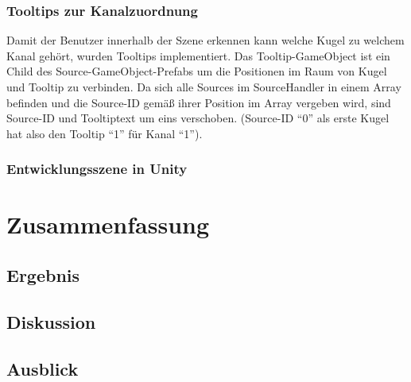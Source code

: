 \documentclass[11pt, titlepage, fleqn]{report}
\begin{document}
            \subsection{Tooltips zur Kanalzuordnung}
            \label{sec:3.3.4}
                Damit der Benutzer innerhalb der Szene erkennen kann welche Kugel zu welchem Kanal gehört, wurden Tooltips implementiert. 
                Das Tooltip-GameObject ist ein Child des Source-GameObject-Prefabs um die Positionen im Raum von Kugel und Tooltip zu verbinden. 
                Da sich alle Sources im SourceHandler in einem Array befinden und die Source-ID gemäß ihrer Position im Array vergeben wird, 
                sind Source-ID und Tooltiptext um eins verschoben. (Source-ID “0” als erste Kugel hat also den Tooltip “1” für Kanal “1”).   
            \subsection{Entwicklungsszene in Unity}%
            \label{sec:3.2.5}
    \chapter{Zusammenfassung}%
    \label{sec:org12d8e10}
        \section{Ergebnis}
        \label{sec:4.1}
        \section{Diskussion}
        \label{sec:4.2}
        \section{Ausblick}
        \label{sec:4.3}
                    
\end{document}
